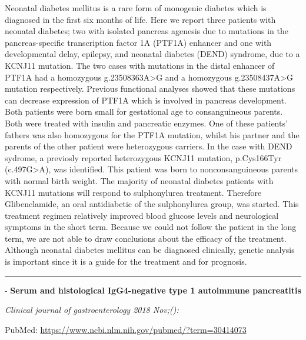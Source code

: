 \documentclass[]{article}
\begin{document}
Neonatal diabetes mellitus is a rare form of monogenic diabetes which is
diagnosed in the first six months of life. Here we report three patients
with neonatal diabetes; two with isolated pancreas agenesis due to
mutations in the pancreas-specific transcription factor 1A (PTF1A)
enhancer and one with developmental delay, epilepsy, and neonatal
diabetes (DEND) syndrome, due to a KCNJ11 mutation. The two cases with
mutations in the distal enhancer of PTF1A had a homozygous
g.23508363A\textgreater{}G and a homozygous g.23508437A\textgreater{}G
mutation respectively. Previous functional analyses showed that these
mutations can decrease expression of PTF1A which is involved in pancreas
development. Both patients were born small for gestational age to
consanguineous parents. Both were treated with insulin and pancreatic
enzymes. One of these patients' fathers was also homozygous for the
PTF1A mutation, whilst his partner and the parents of the other patient
were heterozygous carriers. In the case with DEND sydrome, a previosly
reported heterozygous KCNJ11 mutation, p.Cys166Tyr
(c.497G\textgreater{}A), was identified. This patient was born to
nonconsanguineous parents with normal birth weight. The majority of
neonatal diabetes patients with KCNJ11 mutations will respond to
sulphonylurea treatment. Therefore Glibenclamide, an oral antidiabetic
of the sulphonylurea group, was started. This treatment regimen
relatively improved blood glucose levels and neurological symptoms in
the short term. Because we could not follow the patient in the long
term, we are not able to draw conclusions about the efficacy of the
treatment. Although neonatal diabetes mellitus can be diagnosed
clinically, genetic analysis is important since it is a guide for the
treatment and for prognosis.

{}

{}

\begin{center}\rule{0.5\linewidth}{\linethickness}\end{center}

 - \textbf{Serum and histological IgG4-negative type 1 autoimmune
pancreatitis}

\emph{Clinical journal of gastroenterology 2018 Nov;():}

PubMed: \url{https://www.ncbi.nlm.nih.gov/pubmed/?term=30414073}
\end{document}
